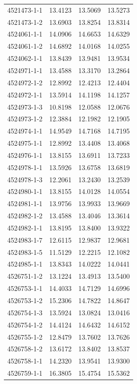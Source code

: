 \begin{longtable}{lrrr}
4521473-1-1 & 13.4123 & 13.5069 & 13.5273 \\
4521473-1-2 & 13.6903 & 13.8254 & 13.8314 \\
4524061-1-1 & 14.0906 & 14.6653 & 14.6329 \\
4524061-1-2 & 14.6892 & 14.0168 & 14.0255 \\
4524062-1-1 & 13.8439 & 13.9481 & 13.9534 \\
4524971-1-1 & 13.4588 & 13.3170 & 13.2864 \\
4524972-1-2 & 12.8992 & 12.4213 & 12.4404 \\
4524972-1-1 & 13.5914 & 14.1198 & 14.1257 \\
4524973-1-3 & 10.8198 & 12.0588 & 12.0676 \\
4524973-1-2 & 12.3884 & 12.1982 & 12.1905 \\
4524974-1-1 & 14.9549 & 14.7168 & 14.7195 \\
4524975-1-1 & 12.8992 & 13.4408 & 13.4068 \\
4524976-1-1 & 13.8155 & 13.6911 & 13.7233 \\
4524978-1-1 & 13.5926 & 13.6758 & 13.6819 \\
4524978-1-3 & 12.2061 & 13.2430 & 13.2539 \\
4524980-1-1 & 13.8155 & 14.0128 & 14.0554 \\
4524981-1-1 & 13.9756 & 13.9933 & 13.9669 \\
4524982-1-2 & 13.4588 & 13.4046 & 13.3614 \\
4524982-1-1 & 13.8195 & 13.8400 & 13.9322 \\
4524983-1-7 & 12.6115 & 12.9837 & 12.9681 \\
4524983-1-5 & 11.5129 & 12.2215 & 12.1082 \\
4524985-1-1 & 13.8343 & 14.0222 & 14.0441 \\
4526751-1-2 & 13.1224 & 13.4913 & 13.5400 \\
4526753-1-1 & 14.4033 & 14.7129 & 14.6996 \\
4526753-1-2 & 15.2306 & 14.7822 & 14.8647 \\
4526754-1-3 & 13.5924 & 13.0824 & 13.0416 \\
4526754-1-2 & 14.4124 & 14.6432 & 14.6152 \\
4526755-1-2 & 12.8479 & 13.7602 & 13.7626 \\
4526758-1-2 & 13.6172 & 13.8402 & 13.8537 \\
4526758-1-1 & 14.2320 & 13.9541 & 13.9300 \\
4526759-1-1 & 16.3805 & 15.4754 & 15.5362 \\

\end{longtable}
